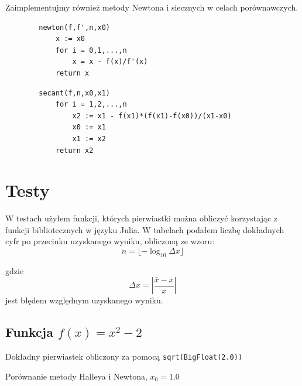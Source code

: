 \documentclass[11pt,a4paper]{article}
\begin{document}
    Zaimplementujmy również metody Newtona i siecznych w celach porównawczych.

    \begin{verbatim}
        newton(f,f',n,x0)
            x := x0
            for i = 0,1,...,n
                x = x - f(x)/f'(x)
            return x
    \end{verbatim}

    \begin{verbatim}
        secant(f,n,x0,x1)
            for i = 1,2,...,n
                x2 := x1 - f(x1)*(f(x1)-f(x0))/(x1-x0)
                x0 := x1
                x1 := x2
            return x2
    \end{verbatim}

    \section{Testy}

    W testach użyłem funkcji, których pierwiastki można obliczyć korzystając z funkcji bibliotecznych w języku Julia. W tabelach podałem liczbę dokładnych cyfr po przecinku uzyskanego wyniku, obliczoną ze wzoru:
    $$
        n = \lfloor-\log_{10}{\Delta x}\rfloor
    $$

    gdzie $$ \Delta x = \left|\frac{\bar{x}-x}{x}\right| $$
    jest błędem względnym uzyskanego wyniku.


    \subsection{Funkcja $f(x)=x^2-2$}

    Dokładny pierwiastek obliczony za pomocą  \verb!sqrt(BigFloat(2.0))!
    
    Porównanie metody Halleya i Newtona, $x_0 = 1.0$\\
\end{document}
